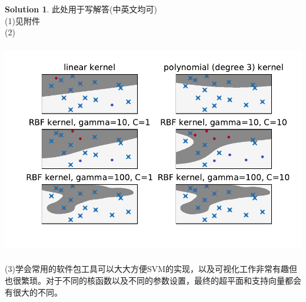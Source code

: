 \documentclass[a4paper,UTF8]{article}
\numberwithin{equation}{section}
\theoremstyle{definition}
\newtheorem*{solution}{Solution}
\begin{document}
\begin{solution}
此处用于写解答(中英文均可)\\
(1)见附件\\
(2)\\
\includegraphics[height=10cm]{figure.pdf}\\
(3)学会常用的软件包工具可以大大方便SVM的实现，以及可视化工作非常有趣但也很繁琐。对于不同的核函数以及不同的参数设置，最终的超平面和支持向量都会有很大的不同。
\end{solution}
\end{document}
